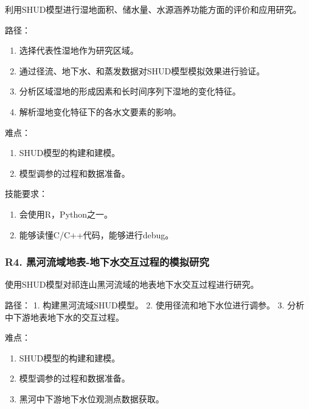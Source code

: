 \documentclass[
]{book}
\providecommand{\tightlist}{%
  \setlength{\itemsep}{0pt}\setlength{\parskip}{0pt}}
\begin{document}
利用SHUD模型进行湿地面积、储水量、水源涵养功能方面的评价和应用研究。

路径：

\begin{enumerate}
\def\labelenumi{\arabic{enumi}.}
\tightlist
\item
  选择代表性湿地作为研究区域。
\item
  通过径流、地下水、和蒸发数据对SHUD模型模拟效果进行验证。
\item
  分析区域湿地的形成因素和长时间序列下湿地的变化特征。
\item
  解析湿地变化特征下的各水文要素的影响。
\end{enumerate}

难点：

\begin{enumerate}
\def\labelenumi{\arabic{enumi}.}
\tightlist
\item
  SHUD模型的构建和建模。
\item
  模型调参的过程和数据准备。
\end{enumerate}

技能要求：

\begin{enumerate}
\def\labelenumi{\arabic{enumi}.}
\tightlist
\item
  会使用R，Python之一。
\item
  能够读懂C/C++代码，能够进行debug。
\end{enumerate}

\hypertarget{r4.-ux9ed1ux6cb3ux6d41ux57dfux5730ux8868-ux5730ux4e0bux6c34ux4ea4ux4e92ux8fc7ux7a0bux7684ux6a21ux62dfux7814ux7a76}{%
\subsubsection{\texorpdfstring{\textbf{R4. 黑河流域地表-地下水交互过程的模拟研究}}{R4. 黑河流域地表-地下水交互过程的模拟研究}}\label{r4.-ux9ed1ux6cb3ux6d41ux57dfux5730ux8868-ux5730ux4e0bux6c34ux4ea4ux4e92ux8fc7ux7a0bux7684ux6a21ux62dfux7814ux7a76}}

使用SHUD模型对祁连山黑河流域的地表地下水交互过程进行研究。

路径：
1. 构建黑河流域SHUD模型。
2. 使用径流和地下水位进行调参。
3. 分析中下游地表地下水的交互过程。

难点：

\begin{enumerate}
\def\labelenumi{\arabic{enumi}.}
\tightlist
\item
  SHUD模型的构建和建模。
\item
  模型调参的过程和数据准备。
\item
  黑河中下游地下水位观测点数据获取。
\end{enumerate}
\end{document}

